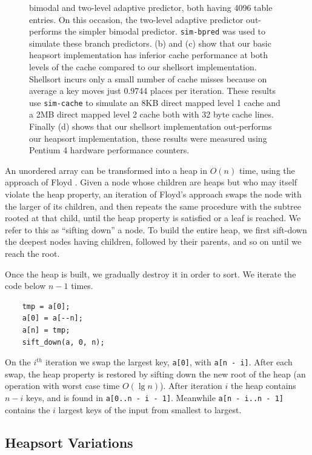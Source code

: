 \documentclass[acmtocl]{acmtrans2m}
\begin{document}
\begin{figure}
{bimodal and two-level adaptive predictor, both having 4096 table entries.  On
this occasion, the two-level adaptive predictor out-performs the simpler bimodal
predictor. \texttt{sim-bpred} was used to simulate these branch predictors.  (b)
and (c) show that our basic heapsort implementation has inferior cache
performance at both levels of the cache compared to our shellsort
implementation. Shellsort incurs only a small number of cache misses because on
average a key moves just 0.9744 places per iteration. These results use
\texttt{sim-cache} to simulate an 8KB direct mapped level 1 cache and a 2MB
direct mapped level 2 cache both with 32 byte cache lines. Finally (d) shows
that our shellsort implementation out-performs our heapsort implementation,
these results were measured using Pentium 4 hardware performance counters.}
\label{shellsort_results_figs}
\end{figure}


An unordered array can be transformed into a heap in $O(n)$ time, using the
approach of Floyd \citeyear{Floyd64}.  Given a node whose children are heaps but
who may itself violate the heap property, an iteration of Floyd's approach swaps
the node with the larger of its children, and then repeats the same procedure
with the subtree rooted at that child, until the heap property is satisfied or a
leaf is reached. We refer to this as ``sifting down'' a node.  To build the
entire heap, we first sift-down the deepest nodes having children, followed by
their parents, and so on until we reach the root.

Once the heap is built, we gradually destroy it in order to sort. We iterate the
code below $n - 1$ times. 

\begin{verbatim}
    tmp = a[0];
    a[0] = a[--n];
    a[n] = tmp;    
    sift_down(a, 0, n);
\end{verbatim}

\noindent On the $i^{th}$ iteration we swap the largest key, \texttt{a[0]}, with
\texttt{a[n - i]}.  After each swap, the heap property is restored by sifting
down the new root of the heap (an operation with worst case time $O(\lg n)$).
After iteration $i$ the heap contains $n - i$ keys, and is found in
\texttt{a[0..n - i - 1]}. Meanwhile \texttt{a[n - i..n - 1]} contains the $i$
largest keys of the input from smallest to largest.

\subsection{Heapsort Variations}
\end{document}
